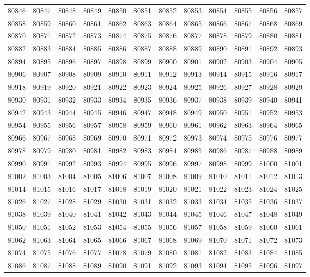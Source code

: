 \begin{center}
\begin{longtable}{llllllllllll}
80846 &80847 &80848 &80849 &80850 &80851 &80852 &80853 &80854 &80855 &80856 &80857 \\
80858 &80859 &80860 &80861 &80862 &80863 &80864 &80865 &80866 &80867 &80868 &80869 \\
80870 &80871 &80872 &80873 &80874 &80875 &80876 &80877 &80878 &80879 &80880 &80881 \\
80882 &80883 &80884 &80885 &80886 &80887 &80888 &80889 &80890 &80891 &80892 &80893 \\
80894 &80895 &80896 &80897 &80898 &80899 &80900 &80901 &80902 &80903 &80904 &80905 \\
80906 &80907 &80908 &80909 &80910 &80911 &80912 &80913 &80914 &80915 &80916 &80917 \\
80918 &80919 &80920 &80921 &80922 &80923 &80924 &80925 &80926 &80927 &80928 &80929 \\
80930 &80931 &80932 &80933 &80934 &80935 &80936 &80937 &80938 &80939 &80940 &80941 \\
80942 &80943 &80944 &80945 &80946 &80947 &80948 &80949 &80950 &80951 &80952 &80953 \\
80954 &80955 &80956 &80957 &80958 &80959 &80960 &80961 &80962 &80963 &80964 &80965 \\
80966 &80967 &80968 &80969 &80970 &80971 &80972 &80973 &80974 &80975 &80976 &80977 \\
80978 &80979 &80980 &80981 &80982 &80983 &80984 &80985 &80986 &80987 &80988 &80989 \\
80990 &80991 &80992 &80993 &80994 &80995 &80996 &80997 &80998 &80999 &81000 &81001 \\
81002 &81003 &81004 &81005 &81006 &81007 &81008 &81009 &81010 &81011 &81012 &81013 \\
81014 &81015 &81016 &81017 &81018 &81019 &81020 &81021 &81022 &81023 &81024 &81025 \\
81026 &81027 &81028 &81029 &81030 &81031 &81032 &81033 &81034 &81035 &81036 &81037 \\
81038 &81039 &81040 &81041 &81042 &81043 &81044 &81045 &81046 &81047 &81048 &81049 \\
81050 &81051 &81052 &81053 &81054 &81055 &81056 &81057 &81058 &81059 &81060 &81061 \\
81062 &81063 &81064 &81065 &81066 &81067 &81068 &81069 &81070 &81071 &81072 &81073 \\
81074 &81075 &81076 &81077 &81078 &81079 &81080 &81081 &81082 &81083 &81084 &81085 \\
81086 &81087 &81088 &81089 &81090 &81091 &81092 &81093 &81094 &81095 &81096 &81097 \\

\end{longtable}
\end{center}
